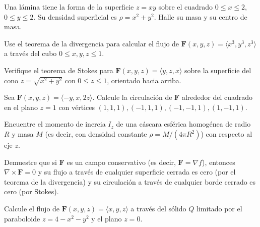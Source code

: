\begin{prob}
Una lámina tiene la forma de la superficie $z=xy$ sobre el cuadrado $0\le x\le 2$, $0\le y\le 2$. Su densidad superficial es $\rho=x^2+y^2$. Halle su masa y su centro de masa.
\end{prob}

\begin{prob}
Use el teorema de la divergencia para calcular el flujo de $\mathbf{F}(x,y,z)=\langle x^3, y^3, z^3\rangle$ a través del cubo $0\le x,y,z\le 1$.
\end{prob}

\begin{prob}
Verifique el teorema de Stokes para $\mathbf{F}(x,y,z)=\langle y, z, x\rangle$ sobre la superficie del cono $z=\sqrt{x^2+y^2}$ con $0\le z\le 1$, orientado hacia arriba.
\end{prob}

\begin{prob}
Sea $\mathbf{F}(x,y,z)=\langle -y, x, 2z\rangle$. Calcule la circulación de $\mathbf{F}$ alrededor del cuadrado en el plano $z=1$ con vértices $(1,1,1),(-1,1,1),(-1,-1,1),(1,-1,1)$.
\end{prob}

\begin{prob}
Encuentre el momento de inercia $I_z$ de una cáscara esférica homogénea de radio $R$ y masa $M$ (es decir, con densidad constante $\rho = M/(4\pi R^2)$) con respecto al eje $z$.
\end{prob}

\begin{prob}
Demuestre que si $\mathbf{F}$ es un campo conservativo (es decir, $\mathbf{F}=\nabla f$), entonces $\nabla\times\mathbf{F}=0$ y su flujo a través de cualquier superficie cerrada es cero (por el teorema de la divergencia) y su circulación a través de cualquier borde cerrado es cero (por Stokes).
\end{prob}

\begin{prob}
Calcule el flujo de $\mathbf{F}(x,y,z)=\langle x, y, z\rangle$ a través del sólido $Q$ limitado por el paraboloide $z=4-x^2-y^2$ y el plano $z=0$.
\end{prob}
